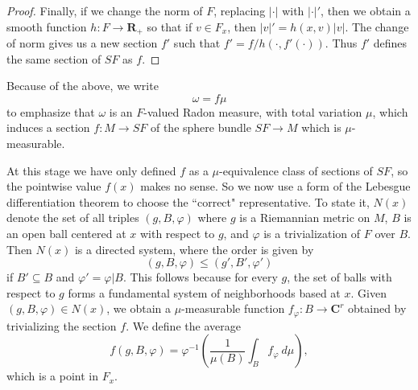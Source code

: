 \documentclass[reqno,12pt,letterpaper]{amsart}
\newcommand{\RR}{\mathbf{R}}
\newcommand{\CC}{\mathbf{C}}
\theoremstyle{definition}
\numberwithin{equation}{section}
\begin{document}
\begin{proof}
Finally, if we change the norm of $F$, replacing $|\cdot|$ with $|\cdot|'$, then we obtain a smooth function $h: F \to \RR_+$ so that if $v \in F_x$, then $|v|' = h(x, v)|v|$.
The change of norm gives us a new section $f'$ such that $f' = f/h(\cdot, f'(\cdot))$.
Thus $f'$ defines the same section of $SF$ as $f$.
\end{proof}

Because of the above, we write
$$\omega = f\mu$$
to emphasize that $\omega$ is an $F$-valued Radon measure, with total variation $\mu$, which induces a section $f: M \to SF$ of the sphere bundle $SF \to M$ which is $\mu$-measurable.

At this stage we have only defined $f$ as a $\mu$-equivalence class of sections of $SF$, so the pointwise value $f(x)$ makes no sense.
So we now use a form of the Lebesgue differentiation theorem to choose the ``correct" representative.
To state it, $N(x)$ denote the set of all triples $(g, B, \varphi)$ where $g$ is a Riemannian metric on $M$, $B$ is an open ball centered at $x$ with respect to $g$, and $\varphi$ is a trivialization of $F$ over $B$.
Then $N(x)$ is a directed system, where the order is given by
$$(g, B, \varphi) \leq (g', B', \varphi')$$
if $B' \subseteq B$ and $\varphi' = \varphi|B$.
This follows because for every $g$, the set of balls with respect to $g$ forms a fundamental system of neighborhoods based at $x$.
Given $(g, B, \varphi) \in N(x)$, we obtain a $\mu$-measurable function $f_\varphi: B \to \CC^r$ obtained by trivializing the section $f$.
We define the average
$$f(g, B, \varphi) = \varphi^{-1}\left(\frac{1}{\mu(B)} \int_B f_\varphi ~d\mu\right),$$
which is a point in $F_x$.
\end{document}
